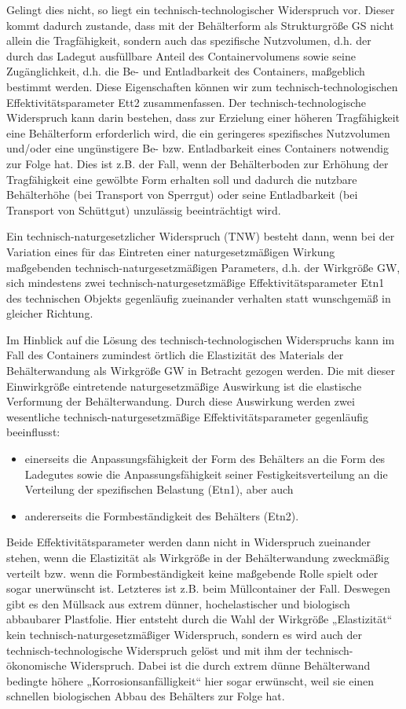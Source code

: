 \documentclass[12pt,a4paper]{article}
\begin{document}
Gelingt dies nicht, so liegt ein technisch-technologischer Widerspruch vor.
Dieser kommt dadurch zustande, dass mit der Behälterform als Strukturgröße GS
nicht allein die Tragfähigkeit, sondern auch das spezifische Nutzvolumen, d.h.
der durch das Ladegut ausfüllbare Anteil des Containervolumens sowie seine
Zugänglichkeit, d.h. die Be- und Entladbarkeit des Containers, maßgeblich
bestimmt werden. Diese Eigenschaften können wir zum technisch-technologischen
Effektivitätsparameter Ett2 zusammenfassen. Der technisch-technologische
Widerspruch kann darin bestehen, dass zur Erzielung einer höheren Tragfähigkeit
eine Behälterform erforderlich wird, die ein geringeres spezifisches
Nutzvolumen und/oder eine ungünstigere Be- bzw. Entladbarkeit eines Containers
notwendig zur Folge hat. Dies ist z.B. der Fall, wenn der Behälterboden zur
Erhöhung der Tragfähigkeit eine gewölbte Form erhalten soll und dadurch die
nutzbare Behälterhöhe (bei Transport von Sperrgut) oder seine Entladbarkeit
(bei Transport von Schüttgut) unzulässig beeinträchtigt wird.

Ein technisch-naturgesetzlicher Widerspruch (TNW) besteht dann, wenn bei der
Variation eines für das Eintreten einer naturgesetzmäßigen Wirkung maßgebenden
technisch-naturgesetzmäßigen Parameters, d.h. der Wirkgröße GW, sich mindestens
zwei technisch-naturgesetzmäßige Effektivitätsparameter Etn1 des technischen
Objekts gegenläufig zueinander verhalten statt wunschgemäß in gleicher
Richtung.

Im Hinblick auf die Lösung des technisch-technologischen Widerspruchs kann im
Fall des Containers zumindest örtlich die Elastizität des Materials der
Behälterwandung als Wirkgröße GW in Betracht gezogen werden. Die mit dieser
Einwirkgröße eintretende naturgesetzmäßige Auswirkung ist die elastische
Verformung der Behälterwandung. Durch diese Auswirkung werden zwei wesentliche
technisch-naturgesetzmäßige Effektivitätsparameter gegenläufig beeinflusst:
\begin{itemize}
\item einerseits die Anpassungsfähigkeit der Form des Behälters an die Form des
  Ladegutes sowie die Anpassungsfähigkeit seiner Festigkeitsverteilung an die
  Verteilung der spezifischen Belastung (Etn1), aber auch
\item andererseits die Formbeständigkeit des Behälters (Etn2).
\end{itemize}
Beide Effektivitätsparameter werden dann nicht in Widerspruch zueinander
stehen, wenn die Elastizität als Wirkgröße in der Behälterwandung zweckmäßig
verteilt bzw. wenn die Formbeständigkeit keine maßgebende Rolle spielt oder
sogar unerwünscht ist. Letzteres ist z.B. beim Müllcontainer der Fall. Deswegen
gibt es den Müllsack aus extrem dünner, hochelastischer und biologisch
abbaubarer Plastfolie. Hier entsteht durch die Wahl der Wirkgröße „Elastizität“
kein technisch-naturgesetzmäßiger Widerspruch, sondern es wird auch der
technisch-technologische Widerspruch gelöst und mit ihm der
technisch-ökonomische Widerspruch. Dabei ist die durch extrem dünne
Behälterwand bedingte höhere „Korrosionsanfälligkeit“ hier sogar erwünscht,
weil sie einen schnellen biologischen Abbau des Behälters zur Folge hat.
\end{document}
